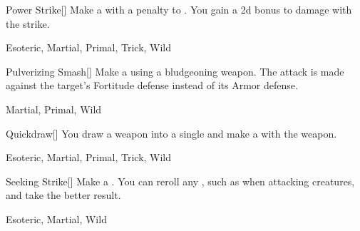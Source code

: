 \lowercase{\hypertarget{maneuver:Power Strike}{}}\label{maneuver:Power Strike}
\hypertarget{maneuver:Power Strike}{}
\begin{freeability}[Rank 1]{Power Strike}[]
Make a  with a  penalty to .
You gain a \plus2d bonus to damage with the strike.


 Esoteric, Martial, Primal, Trick, Wild
\end{freeability}
\vspace{0.25em}



\lowercase{\hypertarget{maneuver:Pulverizing Smash}{}}\label{maneuver:Pulverizing Smash}
\hypertarget{maneuver:Pulverizing Smash}{}
\begin{freeability}[Rank 1]{Pulverizing Smash}[]
Make a  using a bludgeoning weapon.
The attack is made against the target's Fortitude defense instead of its Armor defense.


 Martial, Primal, Wild
\end{freeability}
\vspace{0.25em}



\lowercase{\hypertarget{maneuver:Quickdraw}{}}\label{maneuver:Quickdraw}
\hypertarget{maneuver:Quickdraw}{}
\begin{freeability}[Rank 1]{Quickdraw}[]
You draw a weapon into a single  and make a  with the weapon.


 Esoteric, Martial, Primal, Trick, Wild
\end{freeability}
\vspace{0.25em}



\lowercase{\hypertarget{maneuver:Seeking Strike}{}}\label{maneuver:Seeking Strike}
\hypertarget{maneuver:Seeking Strike}{}
\begin{freeability}[Rank 1]{Seeking Strike}[]
Make a .
You can reroll any , such as when attacking  creatures, and take the better result.


 Esoteric, Martial, Wild
\end{freeability}
\vspace{0.25em}




